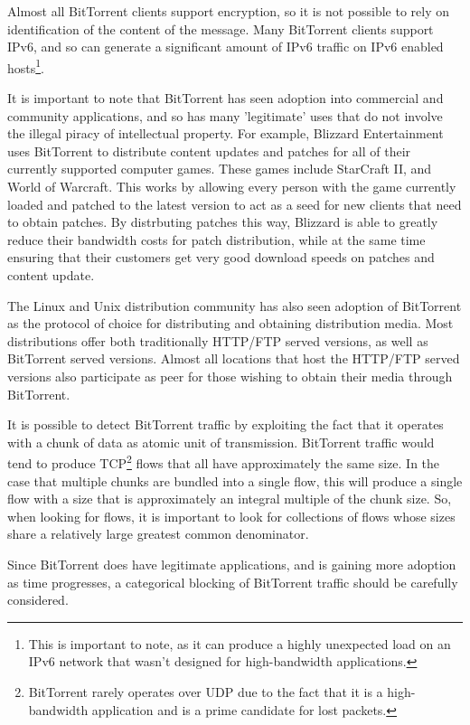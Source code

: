 \documentclass{article}
\theoremstyle{remark}
\theoremstyle{definition}
\theoremstyle{definition}
\theoremstyle{definition}
\begin{document}
Almost all BitTorrent clients support encryption, so it is not possible to rely on identification of the content of the message. Many BitTorrent clients support IPv6, and so can generate a significant amount of IPv6 traffic on IPv6 enabled hosts\footnote{This is important to note, as it can produce a highly unexpected load on an IPv6 network that wasn't designed for high-bandwidth applications.}.

It is important to note that BitTorrent has seen adoption into commercial and community applications, and so has many 'legitimate' uses that do not involve the illegal piracy of intellectual property. For example, Blizzard Entertainment uses BitTorrent to distribute content updates and patches for all of their currently supported computer games. These games include StarCraft II, and World of Warcraft. This works by allowing every person with the game currently loaded and patched to the latest version to act as a seed for new clients that need to obtain patches. By distrbuting patches this way, Blizzard is able to greatly reduce their bandwidth costs for patch distribution, while at the same time ensuring that their customers get very good download speeds on patches and content update.

The Linux and Unix distribution community has also seen adoption of BitTorrent as the protocol of choice for distributing and obtaining distribution media. Most distributions offer both traditionally HTTP/FTP served versions, as well as BitTorrent served versions. Almost all locations that host the HTTP/FTP served versions also participate as peer for those wishing to obtain their media through BitTorrent.

It is possible to detect BitTorrent traffic by exploiting the fact that it operates with a chunk of data as atomic unit of transmission. BitTorrent traffic would tend to produce TCP\footnote{BitTorrent rarely operates over UDP due to the fact that it is a high-bandwidth application and is a prime candidate for lost packets.} flows that all have approximately the same size. In the case that multiple chunks are bundled into a single flow, this will produce a single flow with a size that is approximately an integral multiple of the chunk size. So, when looking for flows, it is important to look for collections of flows whose sizes share a relatively large greatest common denominator.

Since BitTorrent does have legitimate applications, and is gaining more adoption as time progresses, a categorical blocking of BitTorrent traffic should be carefully considered.
\end{document}
